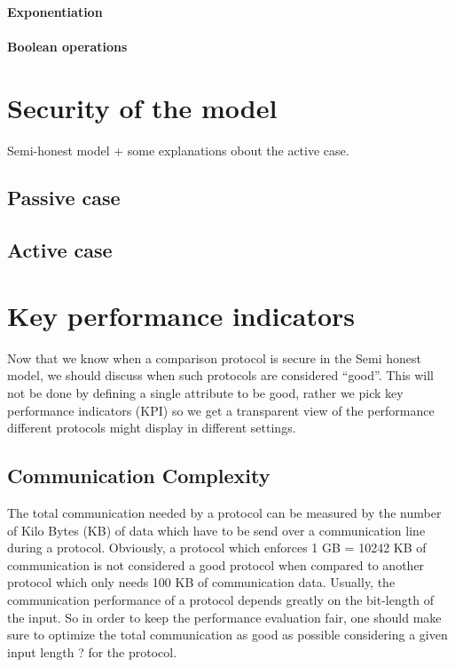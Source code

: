 \paragraph{Exponentiation}


\paragraph{Boolean operations}


\section{Security of the model}
Semi-honest model + some explanations obout the active case.


\subsection{Passive case}



\subsection{Active case}


\section{Key performance indicators}
Now that we know when a comparison protocol is secure in the Semi honest model, we should discuss when such protocols are considered “good”. This will not be done by defining a single attribute to be good, rather we pick key performance indicators (KPI) so we get a transparent view of the performance different protocols might display in different settings.

\subsection{Communication Complexity}
The total communication needed by a protocol can be measured by the number of Kilo Bytes (KB) of data which have to be send over a communication line during a protocol. Obviously, a protocol which enforces 1 GB = 10242 KB of communication is not considered a good protocol when compared to another protocol which only needs 100 KB of communication data. Usually, the communication performance of a protocol depends greatly on the bit-length of the input. So in order to keep the performance evaluation fair, one should make sure to optimize the total communication as good as possible considering a given input length ? for the protocol.

